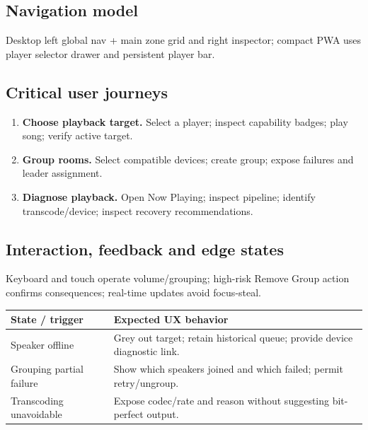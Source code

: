 \documentclass[10pt,a4paper,oneside]{report}
\begin{document}
\subsection*{Navigation model}
Desktop left global nav + main zone grid and right inspector; compact PWA uses player selector drawer and persistent player bar.\par
\subsection*{Critical user journeys}
\begin{enumerate}[leftmargin=*,itemsep=3pt,topsep=2pt]
\item \textbf{Choose playback target.} Select a player; inspect capability badges; play song; verify active target.
\item \textbf{Group rooms.} Select compatible devices; create group; expose failures and leader assignment.
\item \textbf{Diagnose playback.} Open Now Playing; inspect pipeline; identify transcode/device; inspect recovery recommendations.
\end{enumerate}
\subsection*{Interaction, feedback and edge states}
Keyboard and touch operate volume/grouping; high-risk Remove Group action confirms consequences; real-time updates avoid focus-steal.\par
\begin{tabularx}{\linewidth}{@{}p{39mm}X@{}}\toprule State / trigger & Expected UX behavior\\\midrule
Speaker offline & Grey out target; retain historical queue; provide device diagnostic link.\\
Grouping partial failure & Show which speakers joined and which failed; permit retry/ungroup.\\
Transcoding unavoidable & Expose codec/rate and reason without suggesting bit-perfect output.\\
\bottomrule\end{tabularx}
\end{document}
